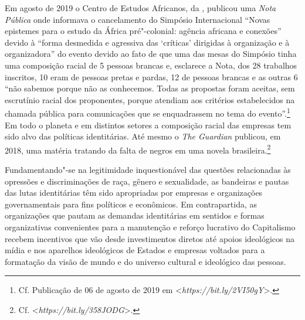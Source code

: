 Em agosto de 2019 o Centro de Estudos Africanos, da , publicou uma
\emph{Nota Pública} onde informava o cancelamento do Simpósio
Internacional ``Novas epistemes para o estudo da África pré"-colonial:
agência africana e conexões'' devido à ``forma desmedida e agressiva das
`críticas' dirigidas à organização e à organizadora'' do evento devido
ao fato de que uma das mesas do Simpósio tinha uma composição racial de
5 pessoas brancas e, esclarece a Nota, dos 28 trabalhos inscritos, 10
eram de pessoas pretas e pardas, 12 de pessoas brancas e as outras 6
``não sabemos porque não as conhecemos. Todas as propostas foram
aceitas, sem escrutínio racial dos proponentes, porque atendiam aos
critérios estabelecidos na chamada pública para comunicações que se
enquadrassem no tema do evento''.\footnote{Cf. Publicação de 06 de
  agosto de 2019 em
  \textless{}\emph{https://bit.ly/2VI50gY}\textgreater{}.}
Em todo o planeta e em distintos setores a composição racial das
empresas tem sido alvo das políticas identitárias. Até mesmo o \emph{The
Guardian} publicou, em 2018, uma matéria tratando da falta de negros em
uma novela brasileira.\footnote{Cf.
  \textless{}\emph{https://bit.ly/358JODG}\textgreater{}.}

Fundamentando"-se na legitimidade inquestionável das questões
relacionadas às opressões e discriminações de raça, gênero e
sexualidade, as bandeiras e pautas das lutas identitárias têm sido
apropriadas por empresas e organizações governamentais para fins
políticos e econômicos. Em contrapartida, as organizações que pautam as
demandas identitárias em sentidos e formas organizativas convenientes
para a manutenção e reforço lucrativo do Capitalismo recebem incentivos
que vão desde investimentos diretos até apoios ideológicos na mídia e
nos aparelhos ideológicos de Estados e empresas voltados para a
formatação da visão de mundo e do universo cultural e ideológico das
pessoas.

